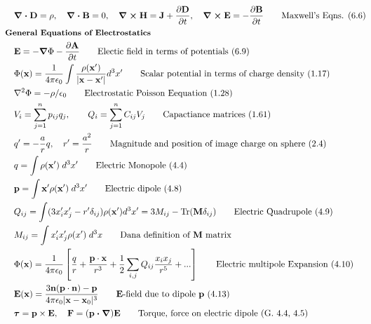 \documentclass[10pt]{article}
\newcommand{\ve}[1]{\boldsymbol{\mathbf{#1}}}
\newcommand{\vect}[1]{\boldsymbol{\mathbf{#1}}}
\newcommand{\vc}[1]{\mathbf{#1}}
\newcommand{\eo}{\epsilon_0}
\newcommand{\pder}[2]{\frac{\partial #1}{\partial #2}}
\newcommand{\K}{\frac{1}{4 \pi \eo}}
\begin{document}
\begin{multicols}{2}
	\tiny
	\setlength{\abovedisplayskip}{-25pt}
	\setlength{\belowdisplayskip}{0pt}
	\setlength{\abovedisplayshortskip}{0pt}
	\setlength{\belowdisplayshortskip}{0pt}
	\begin{align*}
		& \ve{\nabla \cdot D} = \rho, \quad \ve{\nabla \cdot B} = 0, \quad \ve{\nabla \times H} = \ve{J}+\pder{\ve{D}}{t},\quad \ve{\nabla \times E} = - \pder{\ve{B}}{t} \tag*{Maxwell's Eqns. (6.6)}\\
	& \small \hspace{-10pt} \textbf{General Equations of Electrostatics} \small \\
		& \ve{E} = -\ve{\nabla} \Phi - \pder{\ve{A}}{t} \tag*{Electic field in terms of potentials (6.9)} \\
		& \Phi(\vc{x}) = \K \int \frac{\rho (\vc{x}')}{|\vc{x} - \vc{x}'|} d^3 x' \tag*{Scalar potential in terms of charge density (1.17)} \\
		& \nabla^2 \Phi = -\rho/\eo	\tag*{Electrostatic Poisson Eequation (1.28)} \\
		& V_i = \sum_{j=1}^{n} p_{ij} q_j,  \qquad Q_i = \sum_{j=1}^{n} C_{ij} V_j  \tag*{Capactiance matrices (1.61)} \\
		& q' = -\frac{a}{r} q, \quad r' = \frac{a^2}{r}		\tag*{Magnitude and position of image charge on sphere (2.4)} \\
		& q = \int \rho(\vect{x}') \; d^3x'	\tag*{Electric Monopole (4.4)} \\
		& \vect{p} = \int \vect{x}' \rho(\vect{x}') \; d^3x'	\tag*{Electric dipole (4.8)} \\
		& Q_{ij} = \int (3 x_i' x_j'- r' \delta_{ij})\rho(\vect{x}') d^3x' = 3 M_{ij} - \text{Tr}(\vect{M} \delta_{ij})		\tag*{Electric Quadrupole (4.9)} \\
		& M_{ij} = \int x_i' x_j' \rho(x') \; d^3 x \tag*{Dana definition of $\ve{M}$ matrix} \\
		&\Phi(\vect{x}) = \K \left[ \frac{q}{r} + \frac{ \vect{p} \cdot \vect{x}}{r^3} + \frac{1}{2} \sum_{i,j} Q_{ij} \frac{x_i x_j}{r^5} + ... \right] \tag*{Electric multipole Expansion (4.10)} \\
		& \vect{E}(\vect{x}) = \frac{3 \vect{n}(\vect{p} \cdot \vect{n}) - \vect{p}}{4 \pi \eo |\vect{x} - \vect{x}_0|^3} \tag*{$\vect{E}$-field due to dipole $\vect{p}$ (4.13)} \\
		& \ve{\tau} = \ve{p} \times \ve{E}, \quad \ve{F} = (\ve{p \cdot \nabla}) \ve{E} \tag*{Torque, force on electric dipole (G. 4.4, 4.5)} \\

\end{align*}
\end{multicols}
\end{document}
